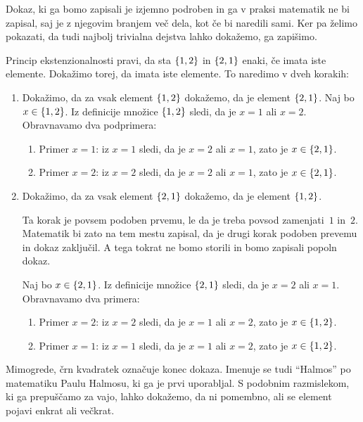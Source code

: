 \begin{dokaz}
  Dokaz, ki ga bomo zapisali je izjemno podroben in ga v praksi matematik ne bi zapisal,
  saj je z njegovim branjem več dela, kot če bi naredili sami. Ker pa želimo pokazati, da
  tudi najbolj trivialna dejstva lahko dokažemo, ga zapišimo.

  Princip ekstenzionalnosti pravi, da sta $\set{1, 2}$ in $\set{2, 1}$ enaki, če imata
  iste elemente. Dokažimo torej, da imata iste elemente. To naredimo v dveh korakih:
  \begin{enumerate}
  \item Dokažimo, da za vsak element $\set{1, 2}$ dokažemo, da je element $\set{2, 1}$.
    Naj bo $x \in \set{1, 2}$. Iz definicije množice $\set{1, 2}$
    sledi, da je $x = 1$ ali $x = 2$. Obravnavamo dva podprimera:
    \begin{enumerate}
    \item Primer $x = 1$: iz $x = 1$ sledi, da je $x = 2$ ali $x = 1$, zato je $x \in \set{2, 1}$.
    \item Primer $x = 2$: iz $x = 2$ sledi, da je $x = 2$ ali $x = 1$, zato je $x \in \set{2, 1}$.
    \end{enumerate}
  \item Dokažimo, da za vsak element $\set{2, 1}$ dokažemo, da je element $\set{1, 2}$.

    Ta korak je povsem podoben prvemu, le da je treba povsod zamenjati~$1$ in~$2$.
    Matematik bi zato na tem mestu zapisal, da je drugi korak podoben prevemu in dokaz
    zaključil. A tega tokrat ne bomo storili in bomo zapisali popoln dokaz.

    Naj bo $x \in \set{2, 1}$. Iz definicije množice $\set{2, 1}$ sledi, da je $x = 2$ ali
    $x = 1$. Obravnavamo dva primera:
    \begin{enumerate}
    \item Primer $x = 2$: iz $x = 2$ sledi, da je $x = 1$ ali $x = 2$, zato je $x \in \set{1, 2}$.
    \item Primer $x = 1$: iz $x = 1$ sledi, da je $x = 1$ ali $x = 2$, zato je $x \in \set{1, 2}$. \qedhere
    \end{enumerate}
  \end{enumerate}
\end{dokaz}

Mimogrede, črn kvadratek označuje konec dokaza. Imenuje se tudi ``Halmos'' po matematiku
Paulu Halmosu, ki ga je prvi uporabljal. S podobnim razmislekom, ki ga prepuščamo za vajo,
lahko dokažemo, da ni pomembno, ali se element pojavi enkrat ali večkrat.

